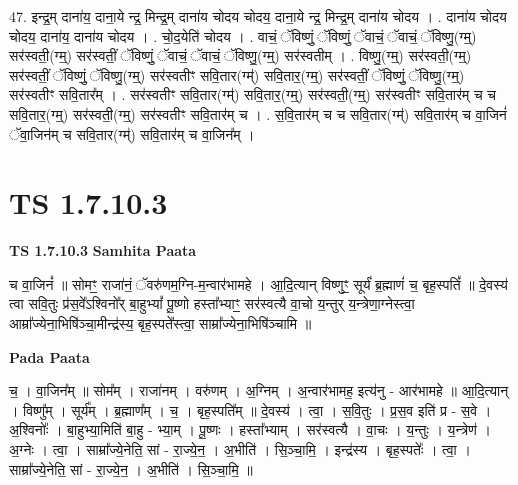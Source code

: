 \documentclass[17pt]{extarticle}
\begin{document}
47. इन्द्र॒म् दाना॑य॒ दाना॒ये न्द्र॒ मिन्द्र॒म् दाना॑य चोदय चोदय॒ दाना॒ये न्द्र॒ मिन्द्र॒म् दाना॑य चोदय । . दाना॑य चोदय चोदय॒ दाना॑य॒ दाना॑य चोदय । . चो॒द॒येति॑ चोदय । . वाचं॒ ॅविष्णुं॒ ॅविष्णुं॒ ॅवाचं॒ ॅवाचं॒ ॅविष्णु॒(ग्म्॒) सर॑स्वती॒(ग्म्॒) सर॑स्वतीं॒ ॅविष्णुं॒ ॅवाचं॒ ॅवाचं॒ ॅविष्णु॒(ग्म्॒) सर॑स्वतीम् । . विष्णु॒(ग्म्॒) सर॑स्वती॒(ग्म्॒) सर॑स्वतीं॒ ॅविष्णुं॒ ॅविष्णु॒(ग्म्॒) सर॑स्वतीꣳ सवि॒तार(ग्म्॑) सवि॒तार॒(ग्म्॒) सर॑स्वतीं॒ ॅविष्णुं॒ ॅविष्णु॒(ग्म्॒) सर॑स्वतीꣳ सवि॒तार᳚म् । . सर॑स्वतीꣳ सवि॒तार(ग्म्॑) सवि॒तार॒(ग्म्॒) सर॑स्वती॒(ग्म्॒) सर॑स्वतीꣳ सवि॒तार॑म् च च सवि॒तार॒(ग्म्॒) सर॑स्वती॒(ग्म्॒) सर॑स्वतीꣳ सवि॒तार॑म् च । . स॒वि॒तार॑म् च च सवि॒तार(ग्म्॑) सवि॒तार॑म् च वा॒जिनं॑ ॅवा॒जिन॑म् च सवि॒तार(ग्म्॑) सवि॒तार॑म् च वा॒जिन᳚म् । \newline
\pagebreak
{}

\section{ TS 1.7.10.3 }

\textbf{TS 1.7.10.3 } \newline
\textbf{Samhita Paata} \newline

च वा॒जिनं᳚ ॥ सोमꣳ॒॒ राजा॑नं॒ ॅवरु॑णम॒ग्नि-म॒न्वार॑भामहे । आ॒दि॒त्यान् विष्णुꣳ॒॒ सूर्यं॑ ब्र॒ह्माणं॑ च॒ बृह॒स्पतिं᳚ ॥ दे॒वस्य॑ त्वा सवि॒तुः प्र॑स॒वे᳚ऽश्विनो᳚र् बा॒हुभ्यां᳚ पू॒ष्णो हस्ता᳚भ्याꣳ॒॒ सर॑स्वत्यै वा॒चो य॒न्तुर् य॒न्त्रेणा॒ग्नेस्त्वा॒ आम्रा᳚ज्येना॒भिषि॑ञ्चा॒मीन्द्र॑स्य॒ बृह॒स्पते᳚स्त्वा॒ साम्रा᳚ज्येना॒भिषि॑ञ्चामि ॥ \newline

\textbf{Pada Paata} \newline

च॒ । वा॒जिन᳚म् ॥ सोम᳚म् । राजा॑नम् । वरु॑णम् । अ॒ग्निम् । अ॒न्वार॑भामह॒ इत्य॑नु - आर॑भामहे ॥ आ॒दि॒त्यान् । विष्णु᳚म् । सूर्य᳚म् । ब्र॒ह्माण᳚म् । च॒ । बृह॒स्पति᳚म् ॥ दे॒वस्य॑ । त्वा॒ । स॒वि॒तुः । प्र॒स॒व इति॑ प्र - स॒वे । अ॒श्विनोः᳚ । बा॒हुभ्या॒मिति॑ बा॒हु - भ्या॒म् । पू॒ष्णः । हस्ता᳚भ्याम् । सर॑स्वत्यै । वा॒चः । य॒न्तुः । य॒न्त्रेण॑ । अ॒ग्नेः । त्वा॒ । साम्रा᳚ज्ये॒नेति॒ सां - रा॒ज्ये॒न॒ । अ॒भीति॑ । सि॒ञ्चा॒मि॒ । इन्द्र॑स्य । बृह॒स्पतेः᳚ । त्वा॒ । साम्रा᳚ज्ये॒नेति॒ सां - रा॒ज्ये॒न॒ । अ॒भीति॑ । सि॒ञ्चा॒मि॒ ॥  \newline
\end{document}
